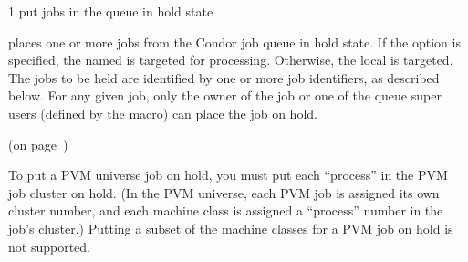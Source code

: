 \begin{ManPage}{\label{man-condor-hold}}{1}
{put jobs in the queue in hold state}
\Synopsis {}


\Description

 places one or more jobs from the Condor job queue in hold state.
If the  option is specified, the named  is targeted
for processing.  
Otherwise, the local  is targeted.
The jobs to be held are identified by one or more job identifiers, as
described below.
For any given job, only the owner of the job or one of the queue super users
(defined by the  macro) can place the job on hold.

\begin{Options}
\end{Options}

\SeeAlso
{} (on page~\pageref{man-condor-release})

\GenRem

To put a PVM universe job on hold, you must put each ``process'' in
the PVM job cluster on hold.  (In the PVM universe, each PVM job is
assigned its own cluster number, and each machine class is assigned a
``process'' number in the job's cluster.)  Putting a subset of the
machine classes for a PVM job on hold is not supported.

\end{ManPage}
